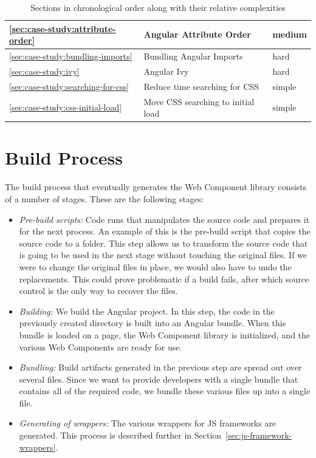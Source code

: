 \begin{table}[h]
\begin{tabularx}{\textwidth}{|l|X|l|}
    \ref{sec:case-study:attribute-order}        & Angular Attribute Order            & medium                       \\ \hline
    \ref{sec:case-study:bundling-imports}       & Bundling Angular Imports           & hard                         \\ \hline
    \ref{sec:case-study:ivy}                    & Angular Ivy                        & hard                         \\ \hline
    \ref{sec:case-study:searching-for-css}      & Reduce time searching for CSS      & simple                       \\ \hline
    \ref{sec:case-study:css-initial-load}       & Move CSS searching to initial load & simple                       \\
  \end{tabularx}
  \caption{Sections in chronological order along with their relative complexities}
  \label{tab:case-study:chronological-issues}
\end{table}

\section{Build Process}\label{sec:build-process}
The build process that eventually generates the Web Component library consists of a number of stages. These are the following stages:

\begin{itemize}
  \item \emph{Pre-build scripts:} Code runs that manipulates the source code and prepares it for the next process. An example of this is the pre-build script that copies the source code to a  folder. This step allows us to transform the source code that is going to be used in the next stage without touching the original files. If we were to change the original files in place, we would also have to undo the replacements. This could prove problematic if a build fails, after which source control is the only way to recover the files.
  \item \emph{Building:} We build the Angular project. In this step, the code in the previously created  directory is built into an Angular bundle. When this bundle is loaded on a page, the Web Component library is initialized, and the various Web Components are ready for use.  
  \item \emph{Bundling:} Build artifacts generated in the previous step are spread out over several files. Since we want to provide developers with a single bundle that contains all of the required code, we bundle these various files up into a single file.
  \item \emph{Generating of wrappers:} The various wrappers for JS frameworks are generated. This process is described further in Section~\ref{sec:js-framework-wrappers}.
\end{itemize}

